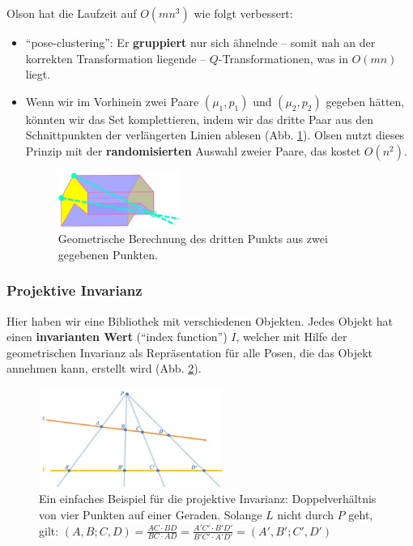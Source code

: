 \begin{itemize}
Olson hat die Laufzeit auf $O(mn^3)$ wie folgt verbessert:
\begin{itemize}
\item "`pose-clustering"': Er \textbf{gruppiert} nur sich ähnelnde -- somit nah an der korrekten Transformation liegende -- $Q$-Transformationen, was in $O(mn)$ liegt.
\item Wenn wir im Vorhinein zwei Paare $(\mu_1,p_1)$ und $(\mu_2,p_2)$ gegeben hätten, könnten wir das Set komplettieren, indem wir das dritte Paar aus den Schnittpunkten der verlängerten Linien ablesen (Abb. \ref{fig:16}).
Olsen nutzt dieses Prinzip mit der \textbf{randomisierten} Auswahl zweier Paare, das kostet $O(n^2)$.
\begin{figure}[h]
\centering
\includegraphics[width=4cm]{chapters/computervision/grafik_16_line.jpg}
\caption{Geometrische Berechnung des dritten Punkts aus zwei gegebenen Punkten.}
\label{fig:16}
\end{figure}
\end{itemize}

\subsubsection{Projektive Invarianz}

Hier haben wir eine Bibliothek mit verschiedenen Objekten.
Jedes Objekt hat einen \textbf{invarianten Wert} ("`index function"') $I$, welcher mit Hilfe der geometrischen Invarianz als Repräsentation für alle Posen, die das Objekt annehmen kann, erstellt wird (Abb. \ref{fig:17}).
\begin{figure}[h]
\centering
\includegraphics[width=6cm]{chapters/computervision/grafik_17_invar.jpg}
\caption{Ein einfaches Beispiel für die projektive Invarianz: Doppelverhältnis von vier Punkten auf einer Geraden. Solange $L$ nicht durch $P$ geht, gilt: $(A,B;C,D)=\frac{AC\cdot BD}{BC\cdot AD}=\frac{A'C'\cdot B'D'}{B'C'\cdot A'D'}=(A',B';C',D')$}
\label{fig:17}
\end{figure}


\end{itemize}
